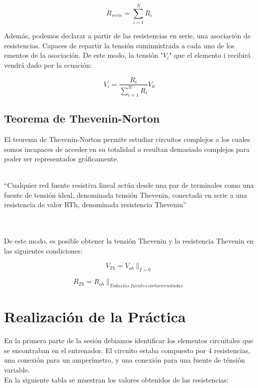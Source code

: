 \documentclass[a4paper,11pt]{article}
\begin{document}
\begin{displaymath}
R_{serie}=\sum_{i=1}^N R_{i}
\end{displaymath}

Además, podemos declarar a partir de las resistencias en serie, una asociación de resistencias. Capaces de repartir la tensión suminnistrada a cada uno de los ementos de la asociación. De este modo, la tensión "$V_i$" que el elemento i recibirá vendrá dado por la ecuación:

\begin{displaymath}
V_i=\frac{R_i}{\sum_{i=1}^N R_{i}}V_0
\end{displaymath}

\subsection{Teorema de Thevenin-Norton}
El teorema de Thevenin-Norton permite estudiar circuitos complejos a los cuales somos incapaces de acceder en su totalidad o resultan demasiado complejos para poder ser representados gráficamente.\\ \\
\begin{em}
“Cualquier red fuente resistiva lineal actúa desde una par de terminales como una fuente de tensión ideal, denominada tensión Thevenin, conectada en serie a una resistencia de valor RTh, denominada resistencia Thevenin”
\end{em}\\ \\
De este modo, es posible obtener la tensión Thevenin y la resistencia Thevenin en las siguientes condiciones:


\begin{displaymath}
V_{Th}=V_{ab}\|_{I=0}
\end{displaymath}

\begin{displaymath}
R_{Th}=R_{ab}\|_{Todas\,las\,fuentes\,cortocircuitadas}
\end{displaymath}

\newpage
\section{Realización de la Práctica}
En la primera parte de la sesión debiamos identificar los elementos circuitales que se encontraban en el entrenador. El circuito estaba compuesto por 4 resistencias, una conexión para un amperímetro, y una conexión para una fuente de ténsión variable.\\
En la siguiente tabla se muestran los valores obtenidos de las resistencias:\\
\end{document}
